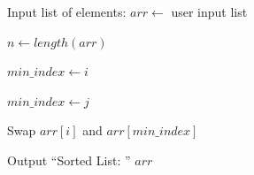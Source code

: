 \begin{algorithm}
\caption{Sort a List Using Selection Sort}
\begin{algorithmic}[1]

\STATE Input list of elements:
\STATE $arr \gets$ user input list

\STATE $n \gets length(arr)$


    \STATE $min\_index \gets i$

            \STATE $min\_index \gets j$
        \ENDIF
    \ENDFOR

    \STATE Swap $arr[i]$ and $arr[min\_index]$

\ENDFOR

\STATE Output ``Sorted List: '' $arr$

\end{algorithmic}
\end{algorithm}